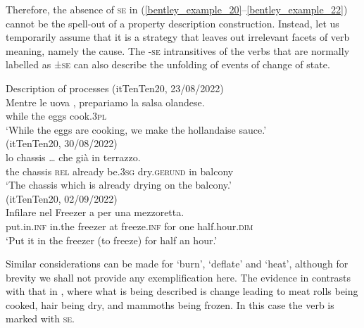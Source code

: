 \documentclass[output=paper,colorlinks,citecolor=brown
]{langscibook}
\begin{document}
Therefore, the absence of \textsc{se} in (\ref{bentley_example_20}--\ref{bentley_example_22}) cannot be the spell-out of a property description construction. Instead, let us temporarily assume that it is a strategy that leaves out irrelevant facets of verb meaning, namely the cause. 
The -\textsc{se} intransitives of the verbs that are normally labelled as ±\textsc{se} can also describe the unfolding of events of change of state. 

\ea \label{bentley_example_24}
    Description of processes
    \ea \label{bentley_example_24a} (itTenTen20, 23/08/2022)\\
    \gll Mentre	le			uova	, { prepariamo la salsa olandese.} \\
    while			the		eggs		cook.3\textsc{pl} {} \\
    \glt ‘While the eggs are cooking, we make the hollandaise sauce.’ \\
    \ex \label{bentley_example_24b} (itTenTen20, 30/08/2022)\\
    \gll  {\ldots}  lo chassis  {\ldots}  che		già 				 				in 	terrazzo.\\
    {} the	chassis	 {}				\textsc{rel}	already	be.3\textsc{sg}	dry.\textsc{gerund}	in		balcony	 \\
    \glt 	‘The chassis which is already drying on the balcony.’ \\
    \ex \label{bentley_example_24c}(itTenTen20, 02/09/2022)\\
    \gll Infilare			nel			Freezer	a				per 	una	mezzoretta.\\
    put.in.\textsc{inf}		in.the	freezer		at	freeze.\textsc{inf}	for		one	half.hour.\textsc{dim} \\
    \glt 					‘Put it in the freezer (to freeze) for half an hour.’ \\
    \z
\z

Similar considerations can be made for  ‘burn’,  ‘deflate’ and  ‘heat’, although for brevity we shall not provide any exemplification here. 
The evidence in  contrasts with that in , where what is being described is change leading to meat rolls being cooked, hair being dry, and mammoths being frozen. In this case the verb is marked with \textsc{se}.
\end{document}

